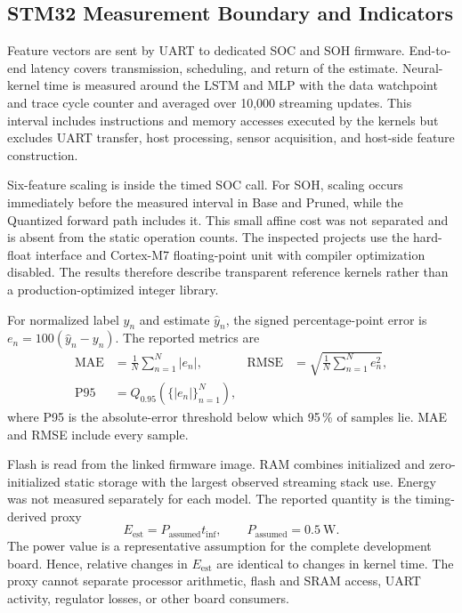 \documentclass[
    a4paper,
    12pt,
    titlepage,
    bibliography=totoc,
    twoside=on,
    parskip=false,
    numbers=noenddot,
    cleardoublepage=empty,
    DIV=12,
    BCOR=12.0mm,
    headheight=36pt,
    headings=openright
]{scrreprt}
\begin{document}
\subsection{STM32 Measurement Boundary and Indicators}
Feature vectors are sent by UART to dedicated SOC and SOH firmware. End-to-end latency covers transmission, scheduling, and return of the estimate. Neural-kernel time is measured around the LSTM and MLP with the data watchpoint and trace cycle counter and averaged over 10,000 streaming updates. This interval includes instructions and memory accesses executed by the kernels but excludes UART transfer, host processing, sensor acquisition, and host-side feature construction.

Six-feature scaling is inside the timed SOC call. For SOH, scaling occurs immediately before the measured interval in Base and Pruned, while the Quantized forward path includes it. This small affine cost was not separated and is absent from the static operation counts. The inspected projects use the hard-float interface and Cortex-M7 floating-point unit with compiler optimization disabled. The results therefore describe transparent reference kernels rather than a production-optimized integer library.

For normalized label $y_n$ and estimate $\hat y_n$, the signed percentage-point error is $e_n=100(\hat y_n-y_n)$. The reported metrics are
\begin{align}
    \mathrm{MAE}&=\frac{1}{N}\sum_{n=1}^{N}|e_n|, &
    \mathrm{RMSE}&=\sqrt{\frac{1}{N}\sum_{n=1}^{N}e_n^2}, \label{eq:embedded_error_metrics}\\
    \mathrm{P95}&=Q_{0.95}\!\left(\{|e_n|\}_{n=1}^{N}\right), \nonumber
\end{align}
where P95 is the absolute-error threshold below which 95\,\% of samples lie. MAE and RMSE include every sample.

Flash is read from the linked firmware image. RAM combines initialized and zero-initialized static storage with the largest observed streaming stack use. Energy was not measured separately for each model. The reported quantity is the timing-derived proxy
\begin{equation}
    E_{\mathrm{est}}=P_{\mathrm{assumed}}t_{\mathrm{inf}}, \qquad
    P_{\mathrm{assumed}}=\SI{0.5}{\watt}.
    \label{eq:embedded_energy_proxy}
\end{equation}
The power value is a representative assumption for the complete development board. Hence, relative changes in $E_{\mathrm{est}}$ are identical to changes in kernel time. The proxy cannot separate processor arithmetic, flash and SRAM access, UART activity, regulator losses, or other board consumers.
\end{document}
